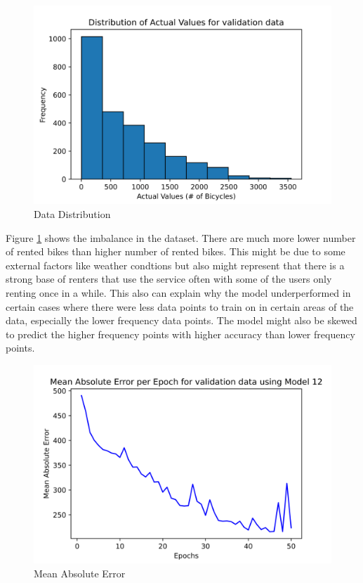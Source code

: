 \documentclass{article}
\begin{document}
    \begin{figure}[h!]
        \includegraphics[width=\linewidth]{images/histo.png}
        \caption{Data Distribution}
        \label{fig:histo}
    \end{figure}
    Figure \ref{fig:histo} shows the imbalance in the dataset. There are much more lower number of rented bikes than higher number of rented bikes.
    This might be due to some external factors like weather condtions but also might represent that there is a strong base of 
    renters that use the service often with some of the users only renting once in a while. This also can explain why the model underperformed 
    in certain cases where there were less data points to train on in certain areas of the data, especially the lower frequency data points. 
    The model might also be skewed to predict the higher frequency points with higher accuracy than lower frequency points.

    \begin{figure}[h!]
        \includegraphics[width=\linewidth]{images/mae.png}
        \caption{Mean Absolute Error}
        \label{fig:mae}
    \end{figure}
\end{document}
